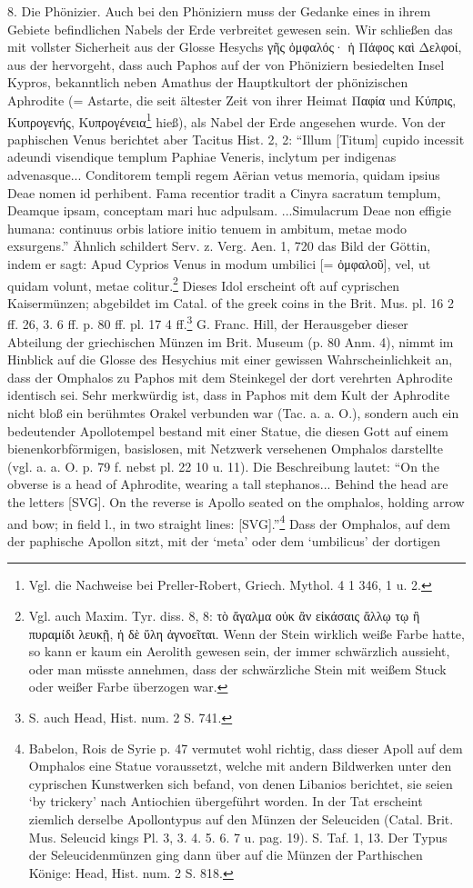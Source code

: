 \documentclass[a4paper, 11pt, oneside]{article}
\begin{document}
8. Die Phönizier. Auch bei den Phöniziern muss der Gedanke eines in ihrem Gebiete befindlichen Nabels der Erde verbreitet gewesen sein. Wir schließen das mit vollster Sicherheit aus der Glosse Hesychs γῆς ὀμφαλός· ἡ Πάφος καὶ Δελφοί, aus der hervorgeht, dass auch Paphos auf der von Phöniziern besiedelten Insel Kypros, bekanntlich neben Amathus der Hauptkultort der phönizischen Aphrodite (= Astarte, die seit ältester Zeit von ihrer Heimat Παφία und Κύπρις, Κυπρογενής, Κυπρογένεια\footnote{Vgl. die Nachweise bei Preller-Robert, Griech. Mythol. 4 1 346, 1 u. 2.} hieß), als Nabel der Erde angesehen wurde. Von der paphischen Venus berichtet aber Tacitus Hist. 2, 2: "`Illum [Titum] cupido incessit adeundi visendique templum Paphiae Veneris, inclytum per indigenas advenasque... Conditorem templi regem Aërian vetus memoria, quidam ipsius Deae nomen id perhibent. Fama recentior tradit a Cinyra sacratum templum, Deamque ipsam, conceptam mari huc adpulsam. ...Simulacrum Deae non effigie humana: continuus orbis latiore initio tenuem in ambitum, metae modo exsurgens."' Ähnlich schildert Serv. z. Verg. Aen. 1, 720 das Bild der Göttin, indem er sagt: Apud Cyprios Venus in modum umbilici [= ὀμφαλοῦ], vel, ut quidam volunt, metae colitur.\footnote{Vgl. auch Maxim. Tyr. diss. 8, 8: τὸ ἄγαλμα οὐκ ἂν εἰκάσαις ἄλλῳ τῳ ἢ πυραμίδι λευκῇ, ἡ δὲ ὕλη ἀγνοεῖται. Wenn der Stein wirklich weiße Farbe hatte, so kann er kaum ein Aerolith gewesen sein, der immer schwärzlich aussieht, oder man müsste annehmen, dass der schwärzliche Stein mit weißem Stuck oder weißer Farbe überzogen war.} Dieses Idol erscheint oft auf cyprischen Kaisermünzen; abgebildet im Catal. of the greek coins in the Brit. Mus. pl. 16 2 ff. 26, 3. 6 ff. p. 80 ff. pl. 17 4 ff.\footnote{S. auch Head, Hist. num. 2 S. 741.} G. Franc. Hill, der Herausgeber dieser Abteilung der griechischen Münzen im Brit. Museum (p. 80 Anm. 4), nimmt im Hinblick auf die Glosse des Hesychius mit einer gewissen Wahrscheinlichkeit an, dass der Omphalos zu Paphos mit dem Steinkegel der dort verehrten Aphrodite identisch sei. Sehr merkwürdig ist, dass in Paphos mit dem Kult der Aphrodite nicht bloß ein berühmtes Orakel verbunden war (Tac. a. a. O.), sondern auch ein bedeutender Apollotempel bestand mit einer Statue, die diesen Gott auf einem bienenkorbförmigen, basislosen, mit Netzwerk versehenen Omphalos darstellte (vgl. a. a. O. p. 79 f. nebst pl. 22 10 u. 11). Die Beschreibung lautet: "`On the obverse is a head of Aphrodite, wearing a tall stephanos... Behind the head are the letters [SVG]. On the reverse is Apollo seated on the omphalos, holding arrow and bow; in field l., in two straight lines: [SVG]."'\footnote{Babelon, Rois de Syrie p. 47 vermutet wohl richtig, dass dieser Apoll auf dem Omphalos eine Statue voraussetzt, welche mit andern Bildwerken unter den cyprischen Kunstwerken sich befand, von denen Libanios berichtet, sie seien `by trickery' nach Antiochien übergeführt worden. In der Tat erscheint ziemlich derselbe Apollontypus auf den Münzen der Seleuciden (Catal. Brit. Mus. Seleucid kings Pl. 3, 3. 4. 5. 6. 7 u. pag. 19). S. Taf. 1, 13. Der Typus der Seleucidenmünzen ging dann über auf die Münzen der Parthischen Könige: Head, Hist. num. 2 S. 818.} Dass der Omphalos, auf dem der paphische Apollon sitzt, mit der `meta' oder dem `umbilicus' der dortigen 
\end{document}
